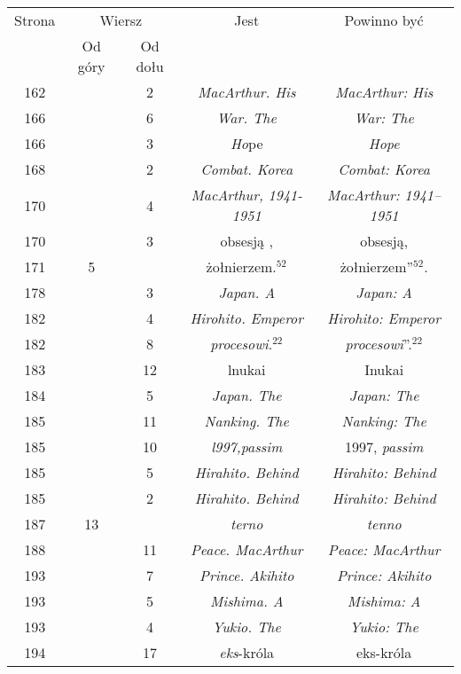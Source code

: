 \documentclass[a4paper,11pt]{article}
\numberwithin{equation}{section}
\begin{document}
\begin{center}
  \begin{tabular}{|c|c|c|c|c|}
    \hline
    Strona & \multicolumn{2}{c|}{Wiersz} & Jest
                              & Powinno być \\ \cline{2-3}
    & Od góry & Od dołu & & \\
    \hline
    162 & &  2 & \textit{MacArthur. His} & \textit{MacArthur: His} \\
    166 & &  6 & \textit{War. The} & \textit{War: The} \\
    166 & &  3 & \textit{Ho}pe & \textit{Hope} \\
    168 & &  2 & \textit{Combat. Korea} & \textit{Combat: Korea} \\
    170 & &  4 & \textit{MacArthur, 1941-1951}
           & \textit{MacArthur: 1941--1951} \\
    170 & &  3 & obsesją , & obsesją, \\
    171 &  5 & & żołnierzem.$^{ 52 }$ & żołnierzem”$^{ 52 }$. \\
    178 & &  3 & \textit{Japan. A} & \textit{Japan: A} \\
    182 & &  4 & \textit{Hirohito. Emperor} & \textit{Hirohito: Emperor} \\
    182 & &  8 & \textit{procesowi}.$^{ 22 }$
    & \textit{procesowi}”.$^{ 22 }$ \\
    183 & & 12 & lnukai & Inukai \\
    184 & &  5 & \textit{Japan. The} & \textit{Japan: The} \\
    185 & & 11 & \textit{Nanking. The} & \textit{Nanking: The} \\
    185 & & 10 & \textit{l997,passim} & 1997, \textit{passim} \\
    185 & &  5 & \textit{Hirahito. Behind} & \textit{Hirahito: Behind} \\
    185 & &  2 & \textit{Hirahito. Behind} & \textit{Hirahito: Behind} \\
    187 & 13 & & \textit{terno} & \textit{tenno} \\
    188 & & 11 & \textit{Peace. MacArthur} & \textit{Peace: MacArthur} \\
    193 & &  7 & \textit{Prince. Akihito} & \textit{Prince: Akihito} \\
    193 & &  5 & \textit{Mishima. A} & \textit{Mishima: A} \\
    193 & &  4 & \textit{Yukio. The} & \textit{Yukio: The} \\
    194 & & 17 & \textit{eks}-króla & eks-króla \\

\end{tabular}
\end{center}
\end{document}
